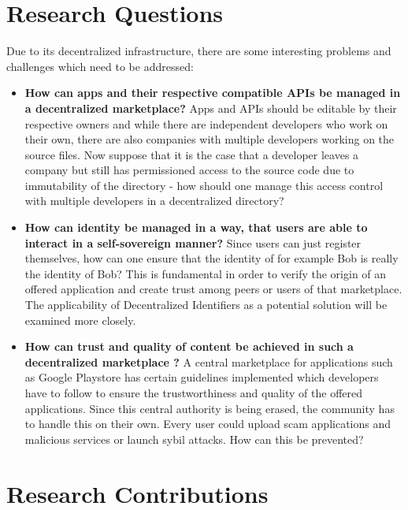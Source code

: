 \section{Research Questions}

Due to its decentralized infrastructure, there are some interesting problems and challenges which need to be addressed: 
\begin{itemize}
    \item \textbf{How can apps and their respective compatible APIs be managed in a decentralized marketplace? } \newline 
    Apps and APIs should be editable by their respective owners and while there are independent developers who work on their own, there are also companies with multiple developers working on the source files. Now suppose that it is the case that a developer leaves a company but still has permissioned access to the source code due to immutability of the directory  -  how should one manage this access control with multiple developers in a decentralized directory? 
    \item \textbf{How can identity be managed in a way, that users are able to interact in a self-sovereign manner?}\newline 
    Since users can just register themselves, how can one ensure that the identity of for example Bob is really the identity of Bob? 
    This is fundamental in order to verify the origin of an offered application and create trust among peers or users of that marketplace. The applicability of Decentralized Identifiers as a potential solution will be examined more closely. 
    \item \textbf{How can trust and quality of content be achieved in such a decentralized  marketplace ? } 
    \newline 
    A central marketplace for applications such as Google Playstore has certain guidelines implemented which developers have to follow to ensure the trustworthiness and quality of the offered applications. Since this central authority is being erased, the community has to handle this on their own. Every user could upload scam applications and malicious services or launch sybil attacks. 
    How can this be prevented? 
\end{itemize}


\section{Research Contributions}
 
